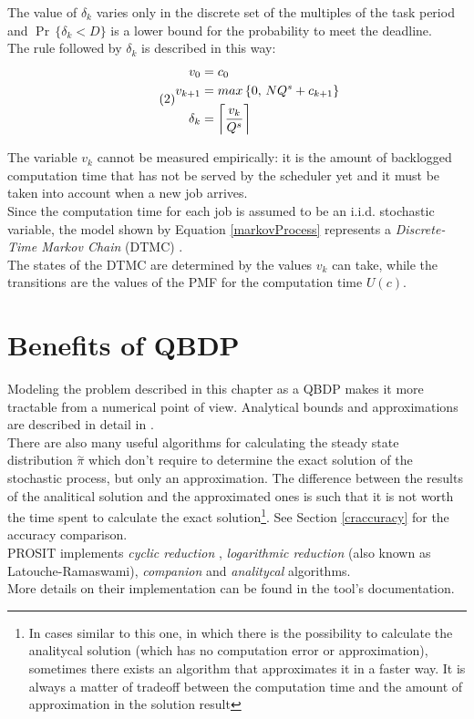 The value of \( \delta_{k} \) varies only in the discrete set of the multiples of the task period and \( \Pr\,\{\delta_{k} < D\} \) is a lower bound for the probability to meet the deadline.\\
The rule followed by \( \delta_{k} \) is described in this way:
\begin{equation} \tag{2} \label{markovProcess}
\begin{split}
  v_{0} &= c_{0}\\
  v_{k+1} &= max\,\{0,\,NQ^{s} + c_{k+1}\}\\
  \delta_{k} &= \ceil[\bigg]{\frac{v_{k}}{Q^{s}}}
\end{split}
\end{equation}

The variable \( v_{k} \) cannot be measured empirically: it is the amount of backlogged computation time that has not be served by the scheduler yet and it must be taken into account when a new job arrives.\\
Since the computation time for each job is assumed to be an i.i.d. stochastic variable, the model shown by Equation \ref{markovProcess} represents a \emph{Discrete-Time Markov Chain} (DTMC) \cite{effRobustGuarantees} \cite{probGuarantees}.\\
The states of the DTMC are determined by the values \( v_{k} \) can take, while the transitions are the values of the PMF for the computation time \( U(c) \).

\section{Benefits of QBDP} \label{benefits}
Modeling the problem described in this chapter as a QBDP makes it more tractable from a numerical point of view. Analytical bounds and approximations are described in detail in \cite{probGuarantees}.\\
There are also many useful algorithms for calculating the steady state distribution \( \overset{\sim}{\pi} \) which don't require to determine the exact solution of the stochastic process, but only an approximation. The difference between the results of the analitical solution and the approximated ones is such that it is not worth the time spent to calculate the exact solution\footnote{In cases similar to this one, in which there is the possibility to calculate the analitycal solution (which has no computation error or approximation), sometimes there exists an algorithm that approximates it in a faster way. It is always a matter of tradeoff between the computation time and the amount of approximation in the solution result}. See Section \ref{craccuracy} for the accuracy comparison.\\
PROSIT implements \emph{cyclic reduction} \cite{cyclic}, \emph{logarithmic reduction} \cite{latouche} (also known as Latouche-Ramaswami), \emph{companion} \cite{probGuarantees} and \emph{analitycal} \cite{probGuarantees} algorithms.\\
More details on their implementation can be found in the tool's documentation.